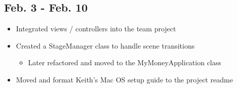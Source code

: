 \documentclass[12pt]{article}
\begin{document}
\subsection*{Feb. 3 - Feb. 10}
\begin{itemize}
    \item Integrated views / controllers into the team project
    \item Created a StageManager class to handle scene transitions
    \begin{itemize}
        \item Later refactored and moved to the MyMoneyApplication class 
    \end{itemize}
    \item Moved and format Keith's Mac OS setup guide to the project readme
\end{itemize}
\end{document}

